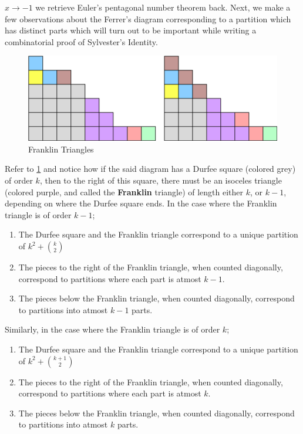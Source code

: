 $x\to -1$ we retrieve Euler's pentagonal number theorem back. Next, we make a few observations about the Ferrer's diagram corresponding to a partition which has distinct parts which will turn out to be important while writing a combinatorial proof of Sylvester's Identity.   
\begin{figure}
    \centering
    \includegraphics[width=0.8\linewidth]{Images/Figure26.png}
    \caption{Franklin Triangles}
    \label{f:FranklinTsF}
\end{figure}
Refer to \cref{f:FranklinTsF} and notice how if the said diagram has a Durfee square (colored grey) of order $k$, then to the right of this square, there must be an isoceles triangle (colored purple, and called the \textbf{Franklin} triangle) of length either $k$, or $k-1$, depending on where the Durfee square ends. In the case where the Franklin triangle is of order $k-1$;   
\begin{enumerate}
			\item The Durfee square and the Franklin triangle correspond to a unique partition of $k^2+\binom{k}{2}$
			\item The pieces to the right of the Franklin triangle, when counted diagonally, correspond to partitions where each part is atmost $k-1$.
			\item The pieces below the Franklin triangle, when counted diagonally, correspond to partitions into atmost $k-1$ parts.
\end{enumerate}
Similarly, in the case where the Franklin triangle is of order $k$;
\begin{enumerate}
			 \item The Durfee square and the Franklin triangle correspond to a unique partition of $k^2+\binom{k+1}{2}$
			 \item The pieces to the right of the Franklin triangle, when counted diagonally, correspond to partitions where each part is atmost $k$.
			 \item The pieces below the Franklin triangle, when counted diagonally, correspond to partitions into atmost $k$ parts.
		\end{enumerate}
